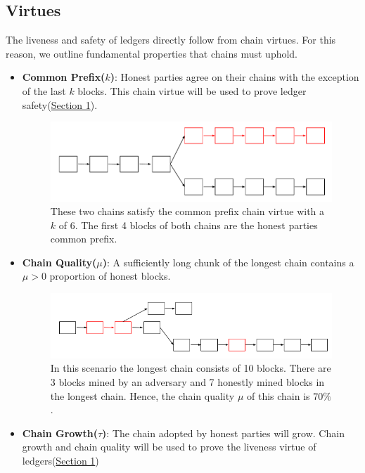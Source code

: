 \subsection{Virtues}
The liveness and safety of ledgers directly follow from chain virtues. For this reason, we outline fundamental properties that chains must uphold.
\begin{itemize}
    \item \textbf{Common Prefix($k$)}:
        Honest parties agree on their chains with the exception of the last $k$ blocks. This chain virtue will be used to prove ledger safety(\hyperref[sec:saftey]{Section 1}).
        \begin{figure}[h]
        \centering
        \includegraphics[width=\linewidth]{figures/commonprefix.pdf}
        \caption{These two chains satisfy the common prefix chain virtue with a $k$ of 6. The first 4 blocks of both chains are the honest parties common prefix.}
        \end{figure}
    \item \textbf{Chain Quality($\mu$)}: A sufficiently long chunk of the longest chain contains a $\mu > 0$ proportion of honest blocks.
    \begin{figure}[h]
    \centering
        \includegraphics[width=\linewidth]{figures/chainquality.png}
        \caption{In this scenario the longest chain consists of 10 blocks. There are 3 blocks mined by an adversary and 7 honestly mined blocks in the longest chain. Hence, the chain quality $\mu$ of this chain is $70\%$. }
    \end{figure}
    \item \textbf{Chain Growth($\tau$)}: The chain adopted by honest parties will grow. Chain growth and chain quality will be used to prove the liveness virtue of ledgers(\hyperref[sec:liveness]{Section 1})

\end{itemize}

